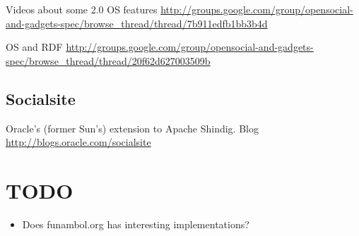\documentclass[12pt,a4paper]{scrartcl}		%
\begin{document}
Videos about some 2.0 OS features \url{http://groups.google.com/group/opensocial-and-gadgets-spec/browse_thread/thread/7b911edfb1bb3b4d}

OS and RDF \url{http://groups.google.com/group/opensocial-and-gadgets-spec/browse_thread/thread/20f62d627003509b}

\subsection{Socialsite}

Oracle's (former Sun's) extension to Apache Shindig. Blog \url{http://blogs.oracle.com/socialsite}

\section{TODO}
\begin{itemize}
\item Does funambol.org has interesting implementations?
\end{itemize}


{}

\end{document}
